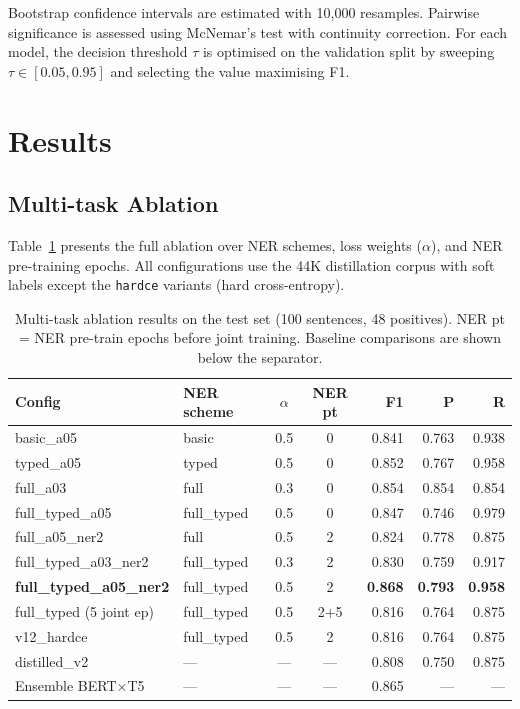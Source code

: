 \documentclass[12pt,a4paper]{article}
\begin{document}
Bootstrap confidence intervals are estimated with 10,000 resamples.
Pairwise significance is assessed using McNemar's test
\citep{mcnemar1947note} with continuity correction. For each model,
the decision threshold $\tau$ is optimised on the validation split
by sweeping $\tau \in [0.05, 0.95]$ and selecting the value
maximising F1.

\section{Results}
\label{sec:results}

\subsection{Multi-task Ablation}

Table~\ref{tab:ablation} presents the full ablation over NER schemes,
loss weights ($\alpha$), and NER pre-training epochs. All configurations
use the 44K distillation corpus with soft labels except the \texttt{hardce}
variants (hard cross-entropy).

\begin{table}[H]
\centering
\small
\caption{Multi-task ablation results on the test set (100 sentences, 48 positives).
NER pt = NER pre-train epochs before joint training.
Baseline comparisons are shown below the separator.}
\label{tab:ablation}
\begin{tabular}{llccrrr}
\toprule
\textbf{Config} & \textbf{NER scheme} & $\alpha$ & \textbf{NER pt} &
\textbf{F1} & \textbf{P} & \textbf{R} \\
\midrule
basic\_a05           & basic       & 0.5 & 0 & 0.841 & 0.763 & 0.938 \\
typed\_a05           & typed       & 0.5 & 0 & 0.852 & 0.767 & 0.958 \\
full\_a03            & full        & 0.3 & 0 & 0.854 & 0.854 & 0.854 \\
full\_typed\_a05     & full\_typed & 0.5 & 0 & 0.847 & 0.746 & 0.979 \\
full\_a05\_ner2      & full        & 0.5 & 2 & 0.824 & 0.778 & 0.875 \\
full\_typed\_a03\_ner2 & full\_typed & 0.3 & 2 & 0.830 & 0.759 & 0.917 \\
\rowcolor{bestrow}
\textbf{full\_typed\_a05\_ner2} & full\_typed & 0.5 & 2 & \textbf{0.868} & \textbf{0.793} & \textbf{0.958} \\
full\_typed (5 joint ep) & full\_typed & 0.5 & 2+5 & 0.816 & 0.764 & 0.875 \\
\midrule
\rowcolor{greyrow}
v12\_hardce          & full\_typed & 0.5 & 2 & 0.816 & 0.764 & 0.875 \\
\rowcolor{greyrow}
distilled\_v2        & ---         & --- & --- & 0.808 & 0.750 & 0.875 \\
\rowcolor{greyrow}
Ensemble BERT$\times$T5 & ---      & --- & --- & 0.865 & ---   & ---   \\
\bottomrule
\end{tabular}
\end{table}
\end{document}
